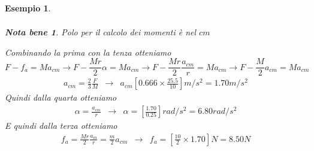 \documentclass{book}
\newtheorem{notab}{Nota bene}
\newtheorem{esempio}{Esempio}
\begin{document}
\begin{esempio}
\begin{eqnarray*}
  \end{eqnarray*}
  \begin{notab}
    Polo per il calcolo dei momenti è nel $cm$
  \end{notab}
  Combinando la prima con la tenza otteniamo
  \begin{equation*}
    F-f_a=Ma_{cm}\to F-\frac{Mr}{2}\alpha = Ma_{cm}\to
    F-\frac{Mr}{2}\frac{a_{cm}}{r}=Ma_{cm} \to F-\frac{M}{2}a_{cm}=Ma_{cm}
  \end{equation*}
  \clearpage
  \begin{eqnarray*}
    \boxed{a_{cm}=\frac{2}{3}\frac{F}{M}} &\to & \boxed{a_{cm}\left[0.666 \times
                                                 \frac{25.5}{10}\right]m/s^2=1.70m/s^2}
  \end{eqnarray*}
  Quindi dalla quarta otteniamo
  \begin{eqnarray*}
    \boxed{\alpha =\frac{a_{cm}}{r}} &\to & \boxed{\alpha
                                            =\left[\frac{1.70}{0.25}\right]rad/s^2=6.80
                                            rad/s^2}
  \end{eqnarray*}
  E quindi dalla terza otteniamo
  \begin{eqnarray*}
    \boxed{f_a=\frac{Mr}{2}\frac{a_m}{r}=\frac{m}{2}a_{cm}} &\to
    & f_a=\left[\frac{10}{2}\times 1.70\right]N=8.50N
  \end{eqnarray*}
\end{esempio}
\end{document}
